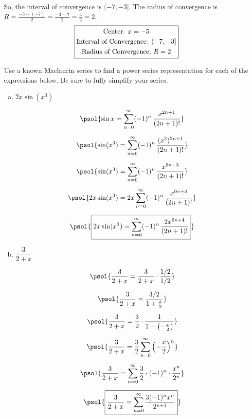 \documentclass[12pt,letterpaper]{exam}
\begin{document}
\begin{questions}
{So, the interval of convergence is $(-7, -3]$. The radius of convergence is $R= \tfrac{-3 - (-7)}{2}= \tfrac{-3 + 7}{2}= \tfrac{4}{2}= 2$.
	\[
	\boxed{%
	\begin{gathered}
	\text{Center: } x= -5 \\
	\text{Interval of Convergence: } (-7, -3] \\
	\text{Radius of Convergence, } R= 2
	\end{gathered}}
	\]
}



\newpage
\question[16] Use a known Maclaurin series to find a power series representation for each of the expressions below. Be sure to fully simplify your series. \par\vspace{0.2cm}
	\begin{enumerate}[(a)]
	\item $2x \sin(x^3)$ \par\vspace{0.3cm}
		\[
		\begin{gathered}
		\psol{\sin x= \sum_{n=0}^\infty (-1)^n\, \dfrac{x^{2n+1}}{(2n + 1)!}} \\[0.2cm]
		\psol{\sin(x^3)= \sum_{n=0}^\infty (-1)^n\, \dfrac{(x^3)^{2n+1}}{(2n + 1)!}} \\[0.2cm]
		\psol{\sin(x^3)= \sum_{n=0}^\infty (-1)^n\, \dfrac{x^{6n+3}}{(2n + 1)!}} \\[0.2cm]
		\psol{2x \sin(x^3)= 2x \sum_{n=0}^\infty (-1)^n\, \dfrac{x^{6n+3}}{(2n + 1)!}} \\[0.2cm]
		\psol{\boxed{2x \sin(x^3)= \sum_{n=0}^\infty (-1)^n\, \dfrac{2x^{6n+4}}{(2n + 1)!}}} \\
		\end{gathered}
		\] \par\vspace{1.2cm}
	
	\item $\dfrac{3}{2 + x}$ \par\vspace{0.2cm}
		\[
		\begin{gathered}
		\psol{\dfrac{3}{2 + x}= \dfrac{3}{2 + x} \cdot \dfrac{1/2}{1/2}} \\[0.2cm]
		\psol{\dfrac{3}{2 + x}= \dfrac{3/2}{1 + \tfrac{x}{2}}} \\[0.2cm]
		\psol{\dfrac{3}{2 + x}= \dfrac{3}{2} \cdot \dfrac{1}{1 - \left( -\tfrac{x}{2} \right)}} \\[0.2cm]
		\psol{\dfrac{3}{2 + x}= \dfrac{3}{2} \sum_{n=0}^\infty \left( -\dfrac{x}{2} \right)^n} \\[0.2cm]
		\psol{\dfrac{3}{2 + x}= \sum_{n=0}^\infty \dfrac{3}{2} \cdot (-1)^n \cdot \dfrac{x^n}{2^n}} \\[0.2cm]
		\psol{\boxed{\dfrac{3}{2 + x}= \sum_{n=0}^\infty \dfrac{3(-1)^n x^n}{2^{n+1}}}}
		\end{gathered}
		\]
	

\end{enumerate}
\end{questions}
\end{document}
